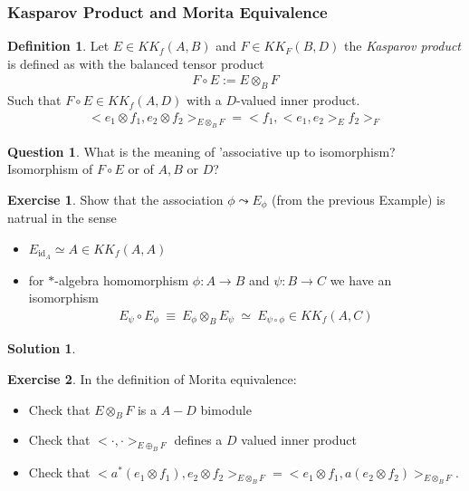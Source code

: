 \documentclass[a4paper]{article}
\theoremstyle{definition}
\newtheorem{definition}{Definition}
\theoremstyle{definition}
\newtheorem{question}{Question}
\theoremstyle{definition}
\theoremstyle{theorem}
\theoremstyle{theorem}
\newtheorem{exercise}{Exercise}
\theoremstyle{theorem}
\theoremstyle{definition}
\newtheorem{solution}{Solution}
\begin{document}
\subsubsection{Kasparov Product and Morita Equivalence}
\begin{definition}
    Let $E \in KK_f(A, B)$ and $F \in KK_F(B, D)$ the \textit{Kasparov product} is defined as
    with the balanced tensor product
    \begin{align*}
        F \circ E := E \otimes _B F
    \end{align*}
    Such that $F\circ E \in KK_f(A,D)$ with a $D$-valued inner product.
    \begin{align*}
        <e_1 \otimes f_1, e_2 \otimes f_2>_{E\otimes _B F} = <f_1,<e_1, e_2>_E f_2>_F
    \end{align*}
\end{definition}

\begin{question}
What is the meaning of 'associative up to isomorphism? Isomorphism of $F \circ E$ or of $A, B$ or $D$?
\end{question}

\begin{exercise}
    Show that the association $\phi \leadsto E_\phi$ (from the previous Example) is natrual
    in the sense
    \begin{itemize}
        \item $E_{\text{id}_A} \simeq A \in KK_f(A,A)$
        \item for $*$-algebra homomorphism $\phi: A \rightarrow B$ and $\psi: B \rightarrow C$ we have
            an isomorphism
            \begin{align*}
                E_{\psi} \circ E_{\phi}\ \equiv\ E_{\phi} \otimes _B E_{\psi}\ \simeq\
                E_{\psi \circ \phi} \in KK_f(A,C)
            \end{align*}
    \end{itemize}
\end{exercise}

\begin{solution}
\end{solution}

\begin{exercise}
    In the definition of Morita equivalence:
    \begin{itemize}
        \item Check that $E \otimes _B F$ is a $A-D$ bimodule
        \item Check that $<\cdot,\cdot>_{E\oplus _B F}$ defines a $D$ valued inner product
        \item Check that $<a^*(e_1 \otimes f_1), e_2 \otimes f_2>_{E \otimes _B F} = <e_1 \otimes f_1, a(e_2 \otimes f_2)>_{E \otimes _B F}$.
    \end{itemize}
\end{exercise}
\end{document}
